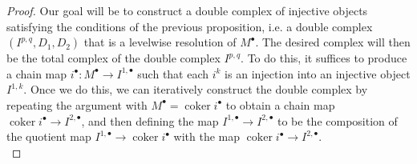 \documentclass[psamsfonts, 12pt]{amsart}
\theoremstyle{definition}
\theoremstyle{remark}
\DeclareMathOperator{\coker}{coker}
\begin{document}
\begin{proof}
Our goal will be to construct a double complex of injective objects satisfying the
conditions of the previous proposition, i.e. a double complex $(I^{p,q},D_1,D_2)$
that is a levelwise resolution  of $M^\bullet$. The desired complex will then be
the total complex of the double complex $I^{p,q}$. To do this, it suffices to
produce a chain map $i^\bullet : M^\bullet \to I^{1,\bullet}$ such that each $i^k$
is an injection into an injective object $I^{1,k}$. Once we do this, we can iteratively
construct the double complex by repeating the argument with
$M^\bullet = \coker i^\bullet$ to obtain a chain map
$\coker i^\bullet \to I^{2,\bullet}$, and then defining the map
$I^{1,\bullet} \to I^{2,\bullet}$ to be the composition  of the quotient map
$I^{1,\bullet} \to \coker i^\bullet$ with the map
$\coker i^\bullet \to I^{2,\bullet}$. \\


\end{proof}
\end{document}

